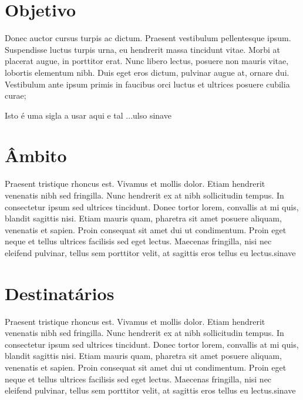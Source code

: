 \section{Objetivo}\label{sec:objetivo}

Donec auctor cursus turpis ac dictum. Praesent vestibulum pellentesque ipsum. Suspendisse luctus turpis urna, eu hendrerit massa tincidunt vitae. Morbi at placerat augue, in porttitor erat. Nunc libero lectus, posuere non mauris vitae,\cite{apa_relatorio_2016} lobortis elementum nibh. Duis eget eros dictum, pulvinar augue at, ornare dui. Vestibulum ante ipsum primis in faucibus orci luctus et ultrices posuere cubilia curae;

Isto é uma sigla a usar aqui e tal ...\gls{ulso} \gls{sinave}


\section{Âmbito}\label{sec:ambito}



Praesent tristique rhoncus est. Vivamus et mollis dolor. Etiam hendrerit venenatis nibh sed fringilla. Nunc hendrerit ex at nibh sollicitudin tempus. In consectetur ipsum sed ultrices tincidunt. Donec tortor lorem, convallis at mi quis, blandit sagittis nisi. Etiam mauris quam, pharetra sit amet posuere aliquam, venenatis et sapien. Proin consequat sit amet dui ut condimentum. Proin eget neque et tellus ultrices facilisis sed eget lectus.\cite{despacho_10401-2015} Maecenas fringilla, nisi nec eleifend pulvinar, tellus sem porttitor velit, at sagittis eros tellus eu lectus.\acrshort{sinave}


\section{Destinatários}\label{sec:destinatarios}

Praesent tristique rhoncus est. Vivamus et mollis dolor. Etiam hendrerit venenatis nibh sed fringilla. Nunc hendrerit ex at nibh sollicitudin tempus. In consectetur ipsum sed ultrices tincidunt. Donec tortor lorem, convallis at mi quis, blandit sagittis nisi. Etiam mauris quam, pharetra sit amet posuere aliquam,\cite{lei_2-2011} venenatis et sapien. Proin consequat sit amet dui ut condimentum. Proin eget neque et tellus ultrices facilisis sed eget lectus. Maecenas fringilla, nisi nec eleifend pulvinar, tellus sem porttitor velit, at sagittis eros tellus eu lectus.\acrshort{sinave}



